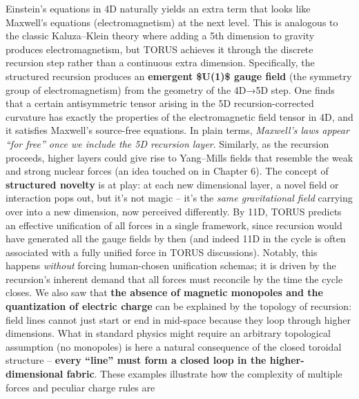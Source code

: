 \documentclass[
]{article}
\begin{document}
\begin{itemize}
  Einstein's equations in 4D naturally yields an extra term that looks
  like Maxwell's equations (electromagnetism) at the next
  level\hspace{0pt}. This is analogous to the classic Kaluza--Klein
  theory where adding a 5th dimension to gravity produces
  electromagnetism, but TORUS achieves it through the discrete recursion
  step rather than a continuous extra dimension. Specifically, the
  structured recursion produces an \textbf{emergent \$U(1)\$ gauge
  field} (the symmetry group of electromagnetism) from the geometry of
  the 4D→5D step\hspace{0pt}. One finds that a certain antisymmetric
  tensor arising in the 5D recursion-corrected curvature has exactly the
  properties of the electromagnetic field tensor in 4D, and it satisfies
  Maxwell's source-free equations\hspace{0pt}. In plain terms,
  \emph{Maxwell's laws appear ``for free'' once we include the 5D
  recursion layer}. Similarly, as the recursion proceeds, higher layers
  could give rise to Yang--Mills fields that resemble the weak and
  strong nuclear forces (an idea touched on in Chapter 6). The concept
  of \textbf{structured novelty} is at play: at each new dimensional
  layer, a novel field or interaction pops out, but it's not magic --
  it's the \emph{same gravitational field} carrying over into a new
  dimension, now perceived differently. By 11D, TORUS predicts an
  effective unification of all forces in a single framework, since
  recursion would have generated all the gauge fields by then (and
  indeed 11D in the cycle is often associated with a fully unified force
  in TORUS discussions). Notably, this happens \emph{without} forcing
  human-chosen unification schemas; it is driven by the recursion's
  inherent demand that all forces must reconcile by the time the cycle
  closes. We also saw that \textbf{the absence of magnetic monopoles and
  the quantization of electric charge} can be explained by the topology
  of recursion: field lines cannot just start or end in mid-space
  because they loop through higher dimensions\hspace{0pt}. What in
  standard physics might require an arbitrary topological assumption (no
  monopoles) is here a natural consequence of the closed toroidal
  structure -- \textbf{every ``line'' must form a closed loop in the
  higher-dimensional fabric}\hspace{0pt}. These examples illustrate how
  the complexity of multiple forces and peculiar charge rules are

\end{itemize}
\end{document}

